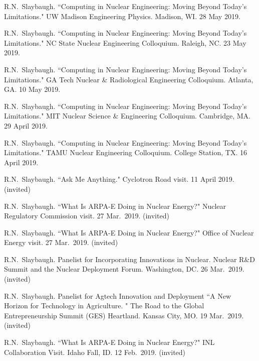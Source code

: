\begin{bibsection}
\item R.N.\ Slaybaugh. ``Computing in Nuclear Engineering: Moving Beyond Today's Limitations." UW Madison Engineering Physics. Madison, WI. 28 May 2019.

\item R.N.\ Slaybaugh. ``Computing in Nuclear Engineering: Moving Beyond Today's Limitations." NC State Nuclear Engineering Colloquium. Raleigh, NC. 23 May 2019.


\item R.N.\ Slaybaugh. ``Computing in Nuclear Engineering: Moving Beyond Today's Limitations." GA Tech Nuclear \& Radiological Engineering Colloquium. Atlanta, GA. 10 May 2019.

\item R.N.\ Slaybaugh. ``Computing in Nuclear Engineering: Moving Beyond Today's Limitations." MIT Nuclear Science \& Engineering Colloquium. Cambridge, MA. 29 April 2019.

\item R.N.\ Slaybaugh. ``Computing in Nuclear Engineering: Moving Beyond Today's Limitations." TAMU Nuclear Engineering Colloquium. College Station, TX. 16 April 2019.

\item R.N.\ Slaybaugh. ``Ask Me Anything." Cyclotron Road visit. 11 April 2019. (invited)

\item R.N.\ Slaybaugh. ``What Is ARPA-E Doing in Nuclear Energy?" Nuclear Regulatory Commission visit. 27 Mar.\ 2019. (invited)

\item R.N.\ Slaybaugh. ``What Is ARPA-E Doing in Nuclear Energy?" Office of Nuclear Energy visit. 27 Mar.\ 2019. (invited)

\item R.N.\ Slaybaugh. Panelist for Incorporating Innovations in Nuclear. Nuclear R\&D Summit and the Nuclear Deployment Forum. Washington, DC. 26 Mar.\ 2019. (invited)

\item R.N.\ Slaybaugh. Panelist for Agtech Innovation and Deployment ``A New Horizon for Technology in Agriculture. " The Road to the Global Entrepreneurship Summit (GES) Heartland. Kansas City, MO. 19 Mar.\ 2019. (invited)

\item R.N.\ Slaybaugh. ``What Is ARPA-E Doing in Nuclear Energy?" INL Collaboration Visit. Idaho Fall, ID. 12 Feb.\ 2019. (invited)


\end{bibsection}
